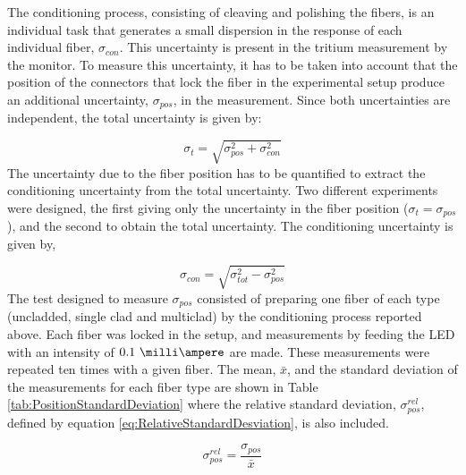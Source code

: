 The conditioning process, consisting of cleaving and polishing the fibers, is an individual task that generates a small dispersion in the response of each individual fiber, $\sigma_{con}$. This uncertainty is present in the tritium measurement by the monitor. To measure this uncertainty, it has to be taken into account that the position of the connectors that lock the fiber in the experimental setup produce an additional uncertainty, $\sigma_{pos}$, in the measurement. Since both uncertainties are independent, the total uncertainty is given by:

\begin{equation}
\sigma_{t} = \sqrt{\sigma^2_{pos} + \sigma^2_{con} }
\label{eq:TotalUncertaintyFiberCharacterization}
\end{equation}
The uncertainty due to the fiber position has to be quantified to extract the conditioning uncertainty from the total uncertainty. Two different experiments were designed, the first giving only the uncertainty in the fiber position ($\sigma_{t} = \sigma_{pos}$), and the second to obtain the total uncertainty. The conditioning uncertainty is given by,

\begin{equation}
\sigma_{con} = \sqrt{\sigma^2_{tot} - \sigma^2_{pos} }
\label{eq:ConditioningUncertaintyFiberCharacterization}
\end{equation}
The test designed to measure $\sigma_{pos}$ consisted of preparing one fiber of each type (uncladded, single clad and multiclad) by the conditioning process reported above. Each fiber was locked in the setup, and measurements by feeding the LED with an intensity of $0.1~\milli\ampere$  are made. These measurements were repeated ten times with a given fiber. The mean, $\bar{x}$, and the standard deviation of the measurements for each fiber type are shown in Table \ref{tab:PositionStandardDeviation} where the relative standard deviation, $\sigma^{rel}_{pos}$, defined by equation \ref{eq:RelativeStandardDesviation}, is also included.

\begin{equation}
\sigma^{rel}_{pos} = \frac{\sigma_{pos}}{\bar{x}}
\label{eq:RelativeStandardDesviation}
\end{equation}


